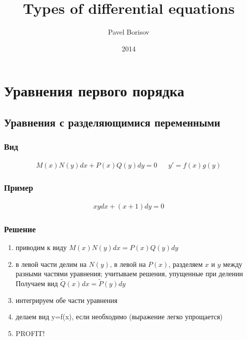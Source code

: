 \documentclass[fontsize=10pt,a4paper,fleqn]{scrreprt} %
\author{Pavel Borisov}
\title{Types of differential equations}
\date{2014}
\numberwithin{equation}{section}
\begin{document}
\maketitle
\newpage
\chapter{Уравнения первого порядка}
\section{Уравнения с разделяющимися переменными}
\label{sec:divided}

\subsection{Вид}
\begin{align}
  \label{eq:divided}
  \boxed{M(x)N(y)dx + P(x)Q(y)dy = 0} && \boxed{y' = f(x)g(y)}
\end{align}

\subsection{Пример}

\begin{align*}
  xydx + (x+1) dy = 0
\end{align*}

\subsection{Решение}

\begin{enumerate}
\item приводим к виду $M(x)N(y)dx = P(x)Q(y)dy$
\item в левой части делим на $N(y)$, в левой на $P(x)$, разделяем $x$ и $y$ между разными частями уравнения; учитываем решения, упущенные при делении\\
  Получаем вид $\widetilde{Q}(x)dx = \widetilde{P}(y)dy$
\item интегрируем обе части уравнения
\item делаем вид y=f(x), если необходимо (выражение легко упрощается)
\item PROFIT!
\end{enumerate}
\end{document}
